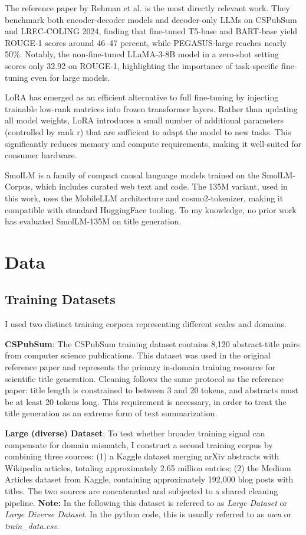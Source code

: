 \documentclass[12pt,conference]{IEEEtran}
\begin{document}
The reference paper by Rehman et al. \cite{b2} is the most directly relevant work. They benchmark both encoder-decoder models and decoder-only LLMs on CSPubSum and LREC-COLING 2024, finding that fine-tuned T5-base and BART-base yield ROUGE-1 scores around 46--47 percent, while PEGASUS-large reaches nearly 50\%. Notably, the non-fine-tuned LLaMA-3-8B model in a zero-shot setting scores only 32.92 on ROUGE-1, highlighting the importance of task-specific fine-tuning even for large models.

LoRA \cite{b3} has emerged as an efficient alternative to full fine-tuning by injecting trainable low-rank matrices into frozen transformer layers. Rather than updating all model weights, LoRA introduces a small number of additional parameters (controlled by rank r) that are sufficient to adapt the model to new tasks. This significantly reduces memory and compute requirements, making it well-suited for consumer hardware.

SmolLM \cite{b4} is a family of compact causal language models trained on the SmolLM-Corpus, which includes curated web text and code. The 135M variant, used in this work, uses the MobileLLM \cite{b5} architecture and cosmo2-tokenizer\cite{b6}, making it compatible with standard HuggingFace tooling. To my knowledge, no prior work has evaluated SmolLM-135M on title generation.


\section{Data}

\subsection{Training Datasets}
I used two distinct training corpora representing different scales and domains.

\textbf{CSPubSum}: The CSPubSum training dataset contains 8,120 abstract-title pairs from computer science publications. This dataset was used in the original reference paper and represents the primary in-domain training resource for scientific title generation. Cleaning follows the same protocol as the reference paper: title length is constrained to between 3 and 20 tokens, and abstracts must be at least 20 tokens long. This requirement is necessary, in order to treat the title generation as an extreme form of text summarization.

\textbf{Large (diverse) Dataset}: To test whether broader training signal can compensate for domain mismatch, I construct a second training corpus by combining three sources: (1) a Kaggle dataset merging arXiv abstracts with Wikipedia articles, totaling approximately 2.65 million entries; (2) the Medium Articles dataset from Kaggle, containing approximately 192,000 blog posts with titles. The two sources are concatenated and subjected to a shared cleaning pipeline. 
\textbf{Note:} In the following this dataset is referred to as \textit{Large Dataset} or \textit{Large Diverse Dataset}. In the python code, this is usually referred to as \textit{own} or \textit{train\_data.csv}.
\end{document}
